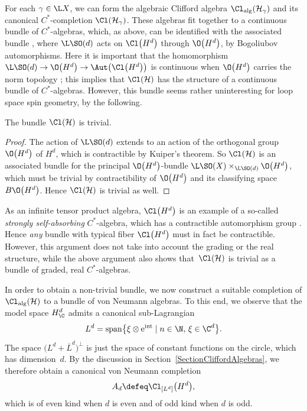 For each $\gamma \in \L X$, we can form the algebraic Clifford algebra $\Cl_{\mathrm{alg}}(\mathcal{H}_\gamma)$ and its canonical $C^*$-completion $\Cl(\mathcal{H}_\gamma)$.
These algebras fit together to a continuous bundle of $C^*$-algebras, which, as above, can be identified with the associated bundle , where $\L\SO(d)$ acts on $\Cl\big(H^d\big)$ through $\O\big(H^d\big)$, by Bogoliubov automorphisms.
Here it is important that the homomorphism $\L\SO(d) \to \O\big(H^d\big) \to \Aut\big(\Cl\big(H^d\big)\big)$ is continuous when $\O\big(H^d\big)$ carries the norm topology \cite[Proposition~4.35]{Ambler2012}; this implies that $\Cl(\mathcal{H})$ has the structure of a continuous bundle of $C^*$-algebras.
However, this bundle seems rather uninteresting for loop space spin geometry, by the following.

\begin{Theorem}
 The bundle $\Cl(\mathcal{H})$ is trivial.
\end{Theorem}

\begin{proof}
The action of $\L\SO(d)$ extends to an action of the orthogonal group $\O\big(H^d\big)$ of $H^d$, which is contractible by Kuiper's theorem.
So $\Cl(\mathcal{H})$ is an associated bundle for the principal $\O\big(H^d\big)$-bundle $\L\SO(X) \times_{\L\SO(d)} \O\big(H^d\big)$, which must be trivial by contractibility of $\O\big(H^d\big)$ and its classifying space $B\O\big(H^d\big)$.
Hence $\Cl(\mathcal{H})$ is trivial as well.
\end{proof}

\begin{Remark}
As an infinite tensor product algebra, $\Cl\big(H^d\big)$ is an example of a so-called \emph{strongly self-absorbing} $C^*$-algebra, which has a contractible automorphism group \cite{DardalatPennig,DardalatWinter}.
Hence \emph{any} bundle with typical fiber $\Cl\big(H^d\big)$ must in fact be contractible.
However, this argument does not take into account the grading or the real structure, while the above argument also shows that~$\Cl(\mathcal{H})$ is trivial as a bundle of graded, real $C^*$-algebras.
\end{Remark}

In order to obtain a non-trivial bundle, we now construct a suitable completion of $\Cl_{\mathrm{alg}}(\mathcal{H})$ to a bundle of von Neumann algebras.
To this end, we observe that the model space $H^d_\C$ admits a canonical sub-Lagrangian
\begin{equation}
\label{SubLagrangianLd}
 L^d = \mathrm{span}\big\{ \xi \otimes{\rm e}^{\rm int} \mid n \in \N, \, \xi \in \C^d\big\}.
\end{equation}
The space $\big(L^d + \overline{L}^d\big)^\perp$ is just the space of constant functions on the circle, which has dimension~$d$.
By the discussion in Section~\ref{SectionCliffordAlgebras}, we therefore obtain a canonical von Neumann completion
\begin{equation} \label{DefinitionAd}
A_d \defeq \Cl_{[L^d]}\big(H^d\big),
\end{equation}
which is of even kind when $d$ is even and of odd kind when $d$ is odd.

